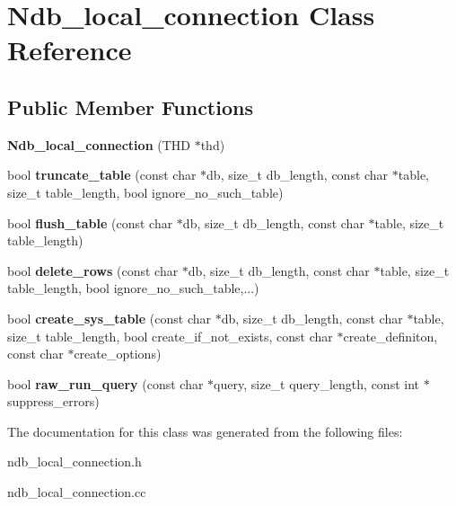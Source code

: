 \hypertarget{classNdb__local__connection}{}\section{Ndb\+\_\+local\+\_\+connection Class Reference}
\label{classNdb__local__connection}
\subsection*{Public Member Functions}
\begin{DoxyCompactItemize}
\item 
\mbox{\label{classNdb__local__connection_a3e961823a20e9a82fff3c9e07b77bfe3}} 
{\bfseries Ndb\+\_\+local\+\_\+connection} (T\+HD $\ast$thd)
\item 
\mbox{\label{classNdb__local__connection_a5d71de38d9398b8cfdd05fdbd94db94c}} 
bool {\bfseries truncate\+\_\+table} (const char $\ast$db, size\+\_\+t db\+\_\+length, const char $\ast$table, size\+\_\+t table\+\_\+length, bool ignore\+\_\+no\+\_\+such\+\_\+table)
\item 
\mbox{\label{classNdb__local__connection_a882be4712a3bb8a7ce1536cb11235546}} 
bool {\bfseries flush\+\_\+table} (const char $\ast$db, size\+\_\+t db\+\_\+length, const char $\ast$table, size\+\_\+t table\+\_\+length)
\item 
\mbox{\label{classNdb__local__connection_a97bcdf56a78de6c090a74c95677cef1c}} 
bool {\bfseries delete\+\_\+rows} (const char $\ast$db, size\+\_\+t db\+\_\+length, const char $\ast$table, size\+\_\+t table\+\_\+length, bool ignore\+\_\+no\+\_\+such\+\_\+table,...)
\item 
\mbox{\label{classNdb__local__connection_a158e0e7df69b2d7f5d7d6be187cdff8c}} 
bool {\bfseries create\+\_\+sys\+\_\+table} (const char $\ast$db, size\+\_\+t db\+\_\+length, const char $\ast$table, size\+\_\+t table\+\_\+length, bool create\+\_\+if\+\_\+not\+\_\+exists, const char $\ast$create\+\_\+definiton, const char $\ast$create\+\_\+options)
\item 
\mbox{\label{classNdb__local__connection_adf43adbe007a34351e1c7368bdd96589}} 
bool {\bfseries raw\+\_\+run\+\_\+query} (const char $\ast$query, size\+\_\+t query\+\_\+length, const int $\ast$suppress\+\_\+errors)
\end{DoxyCompactItemize}


The documentation for this class was generated from the following files\+:\begin{DoxyCompactItemize}
\item 
ndb\+\_\+local\+\_\+connection.\+h\item 
ndb\+\_\+local\+\_\+connection.\+cc\end{DoxyCompactItemize}
